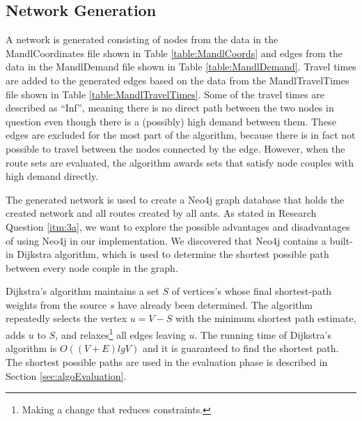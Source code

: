 \subsection{Network Generation}
A network is generated consisting of nodes from the data in the MandlCoordinates file shown in Table \vref{table:MandlCoords} and edges from the data in the MandlDemand file shown in Table \vref{table:MandlDemand}. Travel times are added to the generated edges based on the data from the MandlTravelTimes file shown in Table \vref{table:MandlTravelTimes}. Some of the travel times are described as ``Inf'', meaning there is no direct path between the two nodes in question even though there is a (possibly) high demand between them. These edges are excluded for the most part of the algorithm, because there is in fact not possible to travel between the nodes connected by the edge. However, when the route sets are evaluated, the algorithm awards sets that satisfy node couples with high demand directly. 

The generated network is used to create a Neo4j graph database that holds the created network and all routes created by all ants. As stated in Research Question \vref{itm:3a}, we want to explore the possible advantages and disadvantages of using Neo4j in our implementation. We discovered that Neo4j contains a built-in Dijkstra algorithm, which is used to determine the shortest possible path between every node couple in the graph. 

Dijkstra's algorithm \citet[p.658-662]{cormen09} maintains a set $S$ of vertices's whose final shortest-path weights from the source $s$ have already been determined. The algorithm repeatedly selects the vertex $u = V - S$ with the minimum shortest path estimate, adds $u$ to $S$, and relaxes\footnote{Making a change that reduces constraints.} all edges leaving $u$. The running time of Dijkstra's algorithm is $O((V + E)lg V)$ and it is guaranteed to find the shortest path\citep[p.~661]{cormen09}. The shortest possible paths are used in the evaluation phase is described in Section \vref{sec:algoEvaluation}. 

